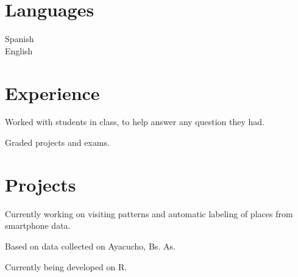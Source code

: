 \documentclass[]{deedy-resume-openfont}
\begin{document}
\begin{minipage}[t]{0.33\textwidth}

\section{Languages}
 Spanish \\
 English
\sectionsep

%
%

\end{minipage} 
\hfill
\begin{minipage}[t]{0.66\textwidth} 


\section{Experience}

\vspace{\topsep} %
\begin{tightemize}
\item Worked with students in class, to help answer any question they had.
\item Graded projects and exams.
\end{tightemize}
\sectionsep


\section{Projects}

\begin{tightemize}
\item Currently working on visiting patterns and
automatic labeling of places from smartphone data.
\item Based on data collected on Ayacucho, Bs. As.
\item Currently being developed on R.
\end{tightemize}
\sectionsep


\end{minipage}
\end{document}
